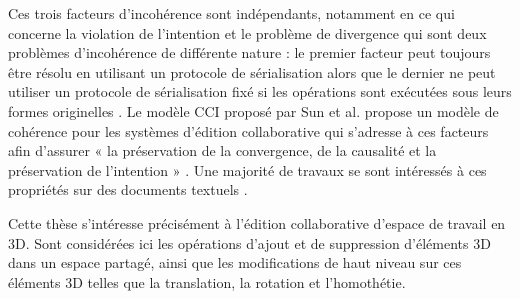 Ces trois facteurs d'incohérence sont indépendants, notamment en ce qui concerne la violation de l'intention et le problème de 
divergence qui sont deux problèmes d'incohérence de différente nature : 
le premier facteur peut toujours être résolu en utilisant un protocole de sérialisation 
alors que le dernier ne peut utiliser un protocole de sérialisation fixé si les 
opérations sont exécutées sous leurs formes originelles \cite{Sun1997}. 
Le modèle \gls{CCI} proposé par Sun et al. \cite{Sun1998} propose un modèle de 
cohérence pour les systèmes d’édition collaborative qui s’adresse à ces facteurs 
afin d'assurer « la préservation 
de la convergence, de la causalité et la préservation de l’intention » 
\cite{Sun1998}. Une majorité de travaux se sont intéressés à ces propriétés sur 
des documents textuels \cite{Weiss2010}. 

Cette thèse s’intéresse précisément à l’édition collaborative d’espace de travail en 
3D. 
Sont considérées ici les opérations d’ajout et de suppression d’éléments 3D dans un espace partagé, 
ainsi que les modifications de haut niveau sur ces éléments 3D telles que la 
translation, la rotation et l’homothétie.

%
%
%

